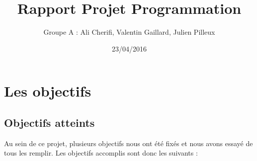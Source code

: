 \documentclass{article}
\title{Rapport Projet Programmation}
\author{Groupe A : Ali Cherifi, Valentin Gaillard, Julien Pilleux}
\date{23/04/2016}
\begin{document}
\maketitle

\newpage



\section {Les objectifs}
\subsection {Objectifs atteints}
Au sein de ce projet, plusieurs objectifs nous ont été fixés et nous avons essayé de tous les remplir.
Les objectifs accomplis sont donc les suivants : \\
\end{document}

